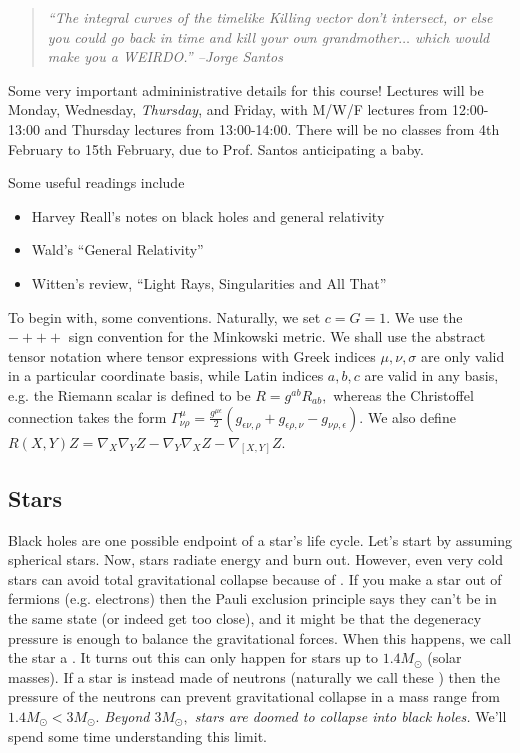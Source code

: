 \begin{quote}
    \textit{``The integral curves of the timelike Killing vector don't intersect, or else you could go back in time and kill your own grandmother$\ldots$ which would make you a WEIRDO.'' --Jorge Santos}
\end{quote}

\begin{note}
Some very important admininistrative details for this course! Lectures will be Monday, Wednesday, \emph{Thursday}, and Friday, with M/W/F lectures from 12:00-13:00 and Thursday lectures from 13:00-14:00. There will be no classes from 4th February to 15th February, due to Prof. Santos anticipating a baby.

Some useful readings include
\begin{itemize}
    \item Harvey Reall's notes on black holes and general relativity
    \item Wald's ``General Relativity''
    \item Witten's review, ``Light Rays, Singularities and All That''
\end{itemize}
\end{note}

To begin with, some conventions. Naturally, we set $c=G=1$. We use the $-+++$ sign convention for the Minkowski metric. We shall use the abstract tensor notation where tensor expressions with Greek indices $\mu,\nu,\sigma$ are only valid in a particular coordinate basis, while Latin indices $a,b,c$ are valid in any basis, e.g. the Riemann scalar is defined to be $R=g^{ab}R_{ab},$ whereas the Christoffel connection takes the form $\Gamma^\mu_{\nu\rho}=\frac{g^{\mu\epsilon}}{2}(g_{\epsilon \nu,\rho}+g_{\epsilon \rho, \nu}-g_{\nu\rho,\epsilon}).$ We also define $R(X,Y)Z=\nabla_X \nabla_Y Z -\nabla_Y \nabla_X Z - \nabla_{[X,Y]}Z$.

\subsection*{Stars} Black holes are one possible endpoint of a star's life cycle. Let's start by assuming spherical stars. Now, stars radiate energy and burn out. However, even very cold stars can avoid total gravitational collapse because of . If you make a star out of fermions (e.g. electrons) then the Pauli exclusion principle says they can't be in the same state (or indeed get too close), and it might be that the degeneracy pressure is enough to balance the gravitational forces. When this happens, we call the star a . It turns out this can only happen for stars up to $1.4 M_\odot$ (solar masses). If a star is instead made of neutrons (naturally we call these ) then the pressure of the neutrons can prevent gravitational collapse in a mass range from $1.4 M_\odot < 3 M_\odot$.
\emph{Beyond $3 M_{\odot},$ stars are doomed to collapse into black holes.} We'll spend some time understanding this limit.

